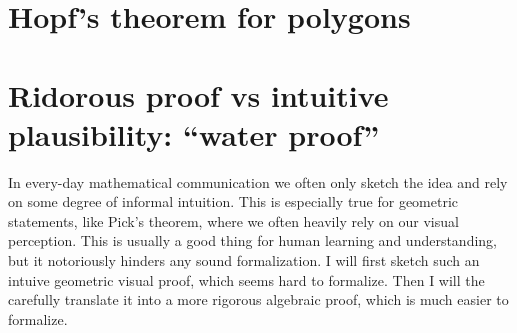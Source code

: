 \documentclass[a4paper]{amsart}
\numberwithin{equation}{section}
\theoremstyle{plain}
\theoremstyle{definition}
\begin{document}
\section{Hopf's theorem for polygons}

\section{Ridorous proof vs intuitive plausibility: ``water proof''}

In every-day mathematical communication we often only sketch
the idea and rely on some degree of informal intuition.
This is especially true for geometric statements,
like Pick's theorem, where we often heavily rely on our visual perception.
This is usually a good thing for human learning and understanding,
but it notoriously hinders any sound formalization.
I will first sketch such an intuive geometric visual proof, which seems hard to formalize.
Then I will the carefully translate it into a more rigorous algebraic proof,
which is much easier to formalize.
\end{document}
